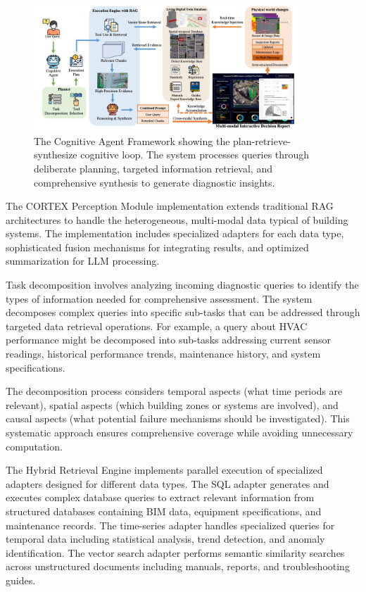 \begin{figure}[htbp]
\centering
\includegraphics[width=0.9\textwidth]{figures/DefectGPT/cognitive_agent_framework.png}

\caption{The Cognitive Agent Framework showing the plan-retrieve-synthesize cognitive loop. The system processes queries through deliberate planning, targeted information retrieval, and comprehensive synthesis to generate diagnostic insights.}
\label{fig:cognitive_agent_framework}
\end{figure}

The CORTEX Perception Module implementation extends traditional RAG architectures to handle the heterogeneous, multi-modal data typical of building systems. The implementation includes specialized adapters for each data type, sophisticated fusion mechanisms for integrating results, and optimized summarization for LLM processing.

Task decomposition involves analyzing incoming diagnostic queries to identify the types of information needed for comprehensive assessment. The system decomposes complex queries into specific sub-tasks that can be addressed through targeted data retrieval operations. For example, a query about HVAC performance might be decomposed into sub-tasks addressing current sensor readings, historical performance trends, maintenance history, and system specifications.

The decomposition process considers temporal aspects (what time periods are relevant), spatial aspects (which building zones or systems are involved), and causal aspects (what potential failure mechanisms should be investigated). This systematic approach ensures comprehensive coverage while avoiding unnecessary computation.

The Hybrid Retrieval Engine implements parallel execution of specialized adapters designed for different data types. The SQL adapter generates and executes complex database queries to extract relevant information from structured databases containing BIM data, equipment specifications, and maintenance records. The time-series adapter handles specialized queries for temporal data including statistical analysis, trend detection, and anomaly identification. The vector search adapter performs semantic similarity searches across unstructured documents including manuals, reports, and troubleshooting guides.


